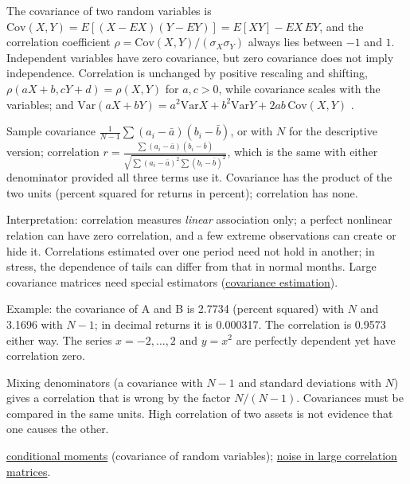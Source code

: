 \begin{qfdefinition}\label{def:return-dependence}
 The covariance of two random variables is $\mathrm{Cov}(X,Y)=E[(X-EX)(Y-EY)]=E[XY]-EX\,EY$, and the correlation coefficient $\rho=\mathrm{Cov}(X,Y)/(\sigma_X\sigma_Y)$ always lies between $-1$ and $1$. Independent variables have zero covariance, but zero covariance does not imply independence. Correlation is unchanged by positive rescaling and shifting, $\rho(aX+b,cY+d)=\rho(X,Y)$ for $a,c>0$, while covariance scales with the variables; and $\mathrm{Var}(aX+bY)=a^2\mathrm{Var}X+b^2\mathrm{Var}Y+2ab\,\mathrm{Cov}(X,Y)$ \citep[sec.~5.3.1]{probability-statistics-random-processes}.

 Sample covariance $\frac1{N-1}\sum(a_i-\bar a)(b_i-\bar b)$, or with $N$ for the descriptive version; correlation $r=\frac{\sum(a_i-\bar a)(b_i-\bar b)}{\sqrt{\sum(a_i-\bar a)^2\sum(b_i-\bar b)^2}}$, which is the same with either denominator provided all three terms use it. Covariance has the product of the two units (percent squared for returns in percent); correlation has none.

 Interpretation: correlation measures \emph{linear} association only; a perfect nonlinear relation can have zero correlation, and a few extreme observations can create or hide it. Correlations estimated over one period need not hold in another; in stress, the dependence of tails can differ from that in normal months. Large covariance matrices need special estimators (\hyperref[meth:portfolio-covariance-estimation]{covariance estimation}).

 Example: the covariance of A and B is 2.7734 (percent squared) with $N$ and 3.1696 with $N-1$; in decimal returns it is 0.000317. The correlation is 0.9573 either way. The series $x=-2,\dots,2$ and $y=x^2$ are perfectly dependent yet have correlation zero.

 Mixing denominators (a covariance with $N-1$ and standard deviations with $N$) gives a correlation that is wrong by the factor $N/(N-1)$. Covariances must be compared in the same units. High correlation of two assets is not evidence that one causes the other.

 \hyperref[def:conditional-moments]{conditional moments} (covariance of random variables); \hyperref[ev:correlation-matrix-noise]{noise in large correlation matrices}.

\end{qfdefinition}

